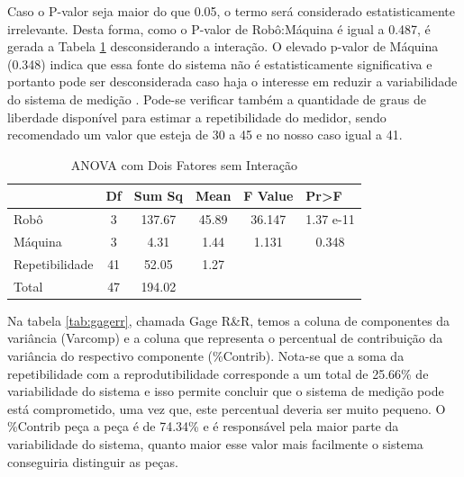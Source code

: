 \documentclass[
12pt,					%
openright,				%
oneside,				%
a4paper,				%
english,
brazil
]{ABNT/abntex2_report}
\begin{document}
Caso o P-valor seja maior do que 0.05, o termo será considerado estatisticamente irrelevante. Desta forma, como o P-valor de Robô:Máquina é igual a 0.487, é gerada a Tabela \ref{tab:no_interaction} desconsiderando a interação. O elevado p-valor de Máquina (0.348) indica que essa fonte do sistema não é estatisticamente significativa e portanto pode ser desconsiderada caso haja o interesse em reduzir a variabilidade do sistema de medição \cite{estudo_rr}. Pode-se verificar também a quantidade de graus de liberdade disponível para estimar a repetibilidade do medidor, sendo recomendado um valor que esteja de 30 a 45 e no nosso caso igual a 41.
\begin{table}[H]
	\centering
	\caption{ANOVA com Dois Fatores sem Interação}
	\begin{tabular}{lccccc}
										& \multicolumn{1}{l}{Df} & \multicolumn{1}{l}{Sum Sq} & \multicolumn{1}{l}{Mean} & \multicolumn{1}{l}{F Value} & \multicolumn{1}{l}{Pr\textgreater{}F} \\ \hline
	\multicolumn{1}{l|}{Robô}           & 3                      & 137.67                     & 45.89                    & 36.147                      & 1.37 e-11                             \\
	\multicolumn{1}{l|}{Máquina}        & 3                      & 4.31                       & 1.44                     & 1.131                       & 0.348                                 \\
	\multicolumn{1}{l|}{Repetibilidade} & 41                     & 52.05                      & 1.27                     &                             &                                       \\
	\multicolumn{1}{l|}{Total}          & 47                     & 194.02                     &                          &                             &                                      
	\end{tabular}
	\label{tab:no_interaction}
\end{table}

Na tabela \ref{tab:gagerr}, chamada Gage R\&R, temos a coluna de componentes da variância (Varcomp) e a coluna que representa o percentual de contribuição da variância do respectivo componente (\%Contrib). Nota-se que a soma da repetibilidade com a reprodutibilidade corresponde a um total de 25.66\% de variabilidade do sistema e isso  permite concluir que o sistema de medição pode está comprometido, uma vez que, este percentual deveria ser muito pequeno. O \%Contrib peça a peça é de 74.34\% e é responsável pela maior parte da variabilidade do sistema,  quanto maior esse valor mais facilmente  o sistema conseguiria distinguir as peças.
\end{document}
